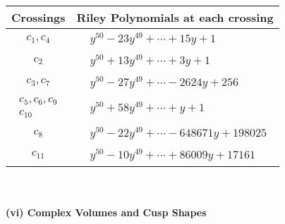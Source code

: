 \documentclass[1p]{elsarticle_modified}
\theoremstyle{definition}
\begin{document}
\begin{tabular}{m{50pt}|m{274pt}}
Crossings & \hspace{64pt}Riley Polynomials at each crossing \\
\hline $$\begin{aligned}c_{1},c_{4}\end{aligned}$$&$\begin{aligned}
&y^{50}-23 y^{49}+\cdots+15 y+1
\end{aligned}$\\
\hline $$\begin{aligned}c_{2}\end{aligned}$$&$\begin{aligned}
&y^{50}+13 y^{49}+\cdots+3 y+1
\end{aligned}$\\
\hline $$\begin{aligned}c_{3},c_{7}\end{aligned}$$&$\begin{aligned}
&y^{50}-27 y^{49}+\cdots-2624 y+256
\end{aligned}$\\
\hline $$\begin{aligned}c_{5},c_{6},c_{9}\\c_{10}\end{aligned}$$&$\begin{aligned}
&y^{50}+58 y^{49}+\cdots+y+1
\end{aligned}$\\
\hline $$\begin{aligned}c_{8}\end{aligned}$$&$\begin{aligned}
&y^{50}-22 y^{49}+\cdots-648671 y+198025
\end{aligned}$\\
\hline $$\begin{aligned}c_{11}\end{aligned}$$&$\begin{aligned}
&y^{50}-10 y^{49}+\cdots+86009 y+17161
\end{aligned}$\\
\hline
\end{tabular}\\~\\
\newpage\flushleft \textbf{(vi) Complex Volumes and Cusp Shapes}
\end{document}
